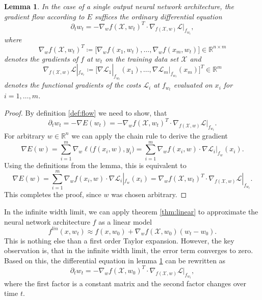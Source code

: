 \documentclass[11pt, a4paper]{article}
\newtheorem{lemma}[theorem]{Lemma}
\newcommand{\R}{\mathds{R}}
\newcommand{\X}{\mathcal{X}}
\renewcommand{\L}{\mathcal{L}}
\begin{document}
\begin{lemma} \label{lem:flow}
In the case of a single output neural network architecture, the gradient flow according to $E$ suffices the ordinary differential equation
\[ \partial_tw_t = - \nabla_wf(\X, w_t)^T \cdot \nabla_{f(\X,w)} \L|_{f_{w_t}}, \]
where 
\[ \nabla_w f(\X, w_t)^T \coloneq \Big [ \nabla_wf(x_1,w_t), \dots, \nabla_wf(x_m, w_t) \Big ] \in \R^{n \times m} \]
denotes the gradients of $f$ at $w_t$ on the training data set $\X$ and 
\[ \nabla_{f(\X,w)} \L|_{f_{w_t}} \coloneq \Big [ \nabla \L_1|_{f_{w_t}}(x_1), \dots, \nabla \L_m|_{f_{w_t}}(x_m) \Big ]^T \in \R^m \]
denotes the functional gradients of the costs $\L_i$ at $f_{w_t}$ evaluated on $x_i$ for $i=1,\dots,m$.
\end{lemma}

\begin{proof}
By definition \ref{def:flow} we need to show, that
\[ \partial_t w_t = - \nabla E(w_t) = - \nabla_wf(\X, w_t)^T \cdot \nabla_{f(\X,w)} \L|_{f_{w_t}}. \]
For arbitrary $w \in \R^n$ we can apply the chain rule to derive the gradient
\[ \nabla E(w) = \sum_{i=1}^{m} \nabla_w \ell \big ( f(x_i,w), y_i \big ) = \sum_{i=1}^{m} \nabla_w f(x_i,w) \cdot \nabla \L_i |_{f_w}(x_i). \]
Using the definitions from the lemma, this is equivalent to
\[ \nabla E(w) = \sum_{i=1}^{m} \nabla_w f(x_i,w) \cdot \nabla \L_i |_{f_w}(x_i) = \nabla_wf(\X, w_t)^T \cdot \nabla_{f(\X,w)} \L|_{f_{w_t}}. \]
This completes the proof, since $w$ was chosen arbitrary.
\end{proof}

In the infinite width limit, we can apply theorem \ref{thm:linear} to approximate the neural network architecture $f$ as a linear model
\[ f^\textit{lin}(x, w_t) \approx f(x, w_0) + \nabla_wf(\X,w_0)(w_t-w_0). \]
This is nothing else than a first order Taylor expansion. However, the key observation is, that in the infinite width limit, the error term converges to zero. Based on this, the differential equation in lemma \ref{lem:flow} can be rewritten as
\[ \partial_tw_t = -\nabla_wf(\X,w_0)^T \cdot \nabla_{f(\X,w)} \L|_{f_{w_t}}, \]
where the first factor is a constant matrix and the second factor changes over time $t$. \\
\end{document}
